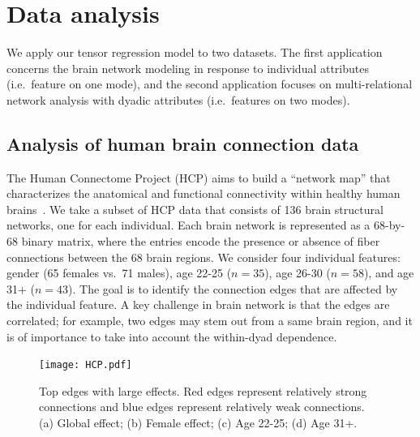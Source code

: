 \documentclass[12pt]{article}
\theoremstyle{plain}
\theoremstyle{definition}
\begin{document}
\section{Data analysis}\label{sec:data}
We apply our tensor regression model to two datasets. The first application concerns the brain network modeling in response to individual attributes (i.e.\ feature on one mode), and the second application focuses on multi-relational network analysis with dyadic attributes (i.e.\ features on two modes). 

\subsection{Analysis of human brain connection data}
The Human Connectome Project (HCP) aims to build a ``network map'' that characterizes the anatomical and functional connectivity within healthy human brains~\citep{HCP}. We take a subset of HCP data that consists of 136 brain structural networks, one for each individual. Each brain network is represented as a 68-by-68 binary matrix, where the entries encode the presence or absence of fiber connections between the 68 brain regions. We consider four individual features: gender (65 females vs.\ 71 males), age 22-25 ($n=35$), age 26-30 ($n=58$), and age 31+ ($n=43$). The goal is to identify the connection edges that are affected by the individual feature. A key challenge in brain network is that the edges are correlated; for example, two edges may stem out from a same brain region, and it is of importance to take into account the within-dyad dependence. 


\begin{figure}[hbt]
\centering
\texttt{[image: HCP.pdf]}
\caption{Top edges with large effects. Red edges represent relatively strong connections and blue edges represent relatively weak connections. (a) Global effect; (b) Female effect; (c) Age 22-25; (d) Age 31+.}\label{fig:brain}
\end{figure}
\end{document}
